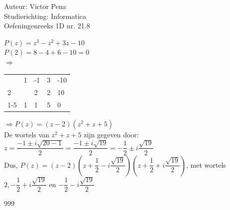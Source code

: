 \documentclass[a4paper]{article}
\begin{document}
	
	\noindent \large Auteur: Victor Pena \\
	\noindent \large Studierichting: Informatica\\
	\noindent \large Oefeningenreeks 1D nr. 21.8\\
	
	\medskip
	
	\normalsize 
	
	$P(z)=z^3 -z^2 + 3z - 10$ \\
	
	
	$P(2)=8 - 4 + 6 - 10 = 0$\\
	
	$\Rightarrow$ \begin{tabular}{l|lll|l}
		 & 1 & -1 & 3  &-10 \\
		2&   & 2  & 2  &10 \\  \cline{1-5}
		 & 1 & 1  & 5  &0
	\end{tabular} $\Rightarrow P(z) = (z-2)(z^2 + z + 5)$\\
	
	
	De wortels van $z^2 + z + 5$ zijn gegeven door: \\
	
	$z = \dfrac{-1 \pm i\sqrt{20-1}}{2} = \dfrac{-1 \pm i\sqrt{19}}{2} = -\dfrac{1}{2} \pm i\dfrac{\sqrt{19}}{2}$\\
	
	
	Dus, $P(z) = (z-2)(z+\dfrac{1}{2}-i\dfrac{\sqrt{19}}{2})(z+\dfrac{1}{2}+i\dfrac{\sqrt{19}}{2})$, met wortels $2,-\dfrac{1}{2}+i\dfrac{\sqrt{19}}{2}$ en $-\dfrac{1}{2}-i\dfrac{\sqrt{19}}{2}$ \\
	
	
	
	
	
	
	
	
	
	\begin{thebibliography}{999}
	\end{thebibliography}
\end{document}

